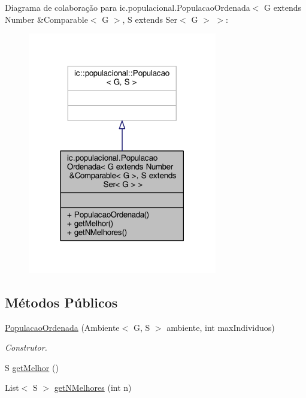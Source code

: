 Diagrama de colaboração para ic.\-populacional.\-Populacao\-Ordenada$<$ G extends Number \&Comparable$<$ G $>$, S extends Ser$<$ G $>$ $>$\-:
\nopagebreak
\begin{figure}[H]
\begin{center}
\leavevmode
\includegraphics[width=234pt]{classic_1_1populacional_1_1_populacao_ordenada_3_01_g_01extends_01_number_01_6_comparable_3_01_g4c93cb978e06771b490602238b7b41f3}
\end{center}
\end{figure}
\subsection*{Métodos Públicos}
\begin{DoxyCompactItemize}
\item 
\hyperlink{classic_1_1populacional_1_1_populacao_ordenada_3_01_g_01extends_01_number_01_6_comparable_3_01_gcbbf91bc78c3435d640426d27f204196_a3fdb0c7389415490f8875de85ff76bae}{Populacao\-Ordenada} (Ambiente$<$ G, S $>$ ambiente, int max\-Individuos)
\begin{DoxyCompactList}\small\item\em Construtor. \end{DoxyCompactList}\item 
S \hyperlink{classic_1_1populacional_1_1_populacao_ordenada_3_01_g_01extends_01_number_01_6_comparable_3_01_gcbbf91bc78c3435d640426d27f204196_a085922551f8405b616638ab84756f28e}{get\-Melhor} ()
\item 
List$<$ S $>$ \hyperlink{classic_1_1populacional_1_1_populacao_ordenada_3_01_g_01extends_01_number_01_6_comparable_3_01_gcbbf91bc78c3435d640426d27f204196_a59006c0b3b86fd64b7d7f9527dbf3518}{get\-N\-Melhores} (int n)
\end{DoxyCompactItemize}


